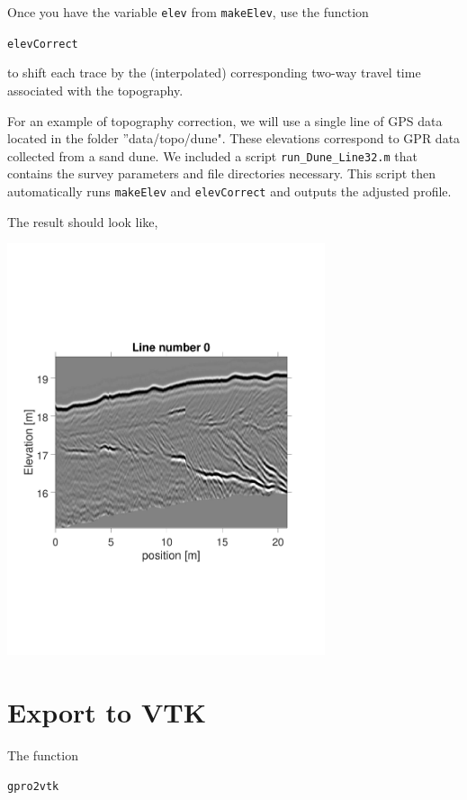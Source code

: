 \documentclass[11pt]{article}
\begin{document}
Once you have the variable \verb#elev# from \verb#makeElev#, use the function

\qquad \verb#elevCorrect#

to shift each trace by the (interpolated) corresponding two-way travel
time associated with the topography. 

For an example of topography correction, we will use a single line of GPS data 
located in the folder ''data/topo/dune". These elevations correspond to GPR data
collected from a sand dune. We included a script \verb#run_Dune_Line32.m# that
contains the survey parameters and file directories necessary. This script then 
automatically runs \verb#makeElev# and \verb#elevCorrect# and outputs the adjusted
profile.

The result should look like,

\begin{center}
\includegraphics[width=0.7\textwidth, trim = 0.9cm 6cm 2cm
  6.5cm,clip]{figures/TopoCorrection}
\end{center}



\section{Export to VTK}

The function

\qquad \verb#gpro2vtk#
\end{document}

